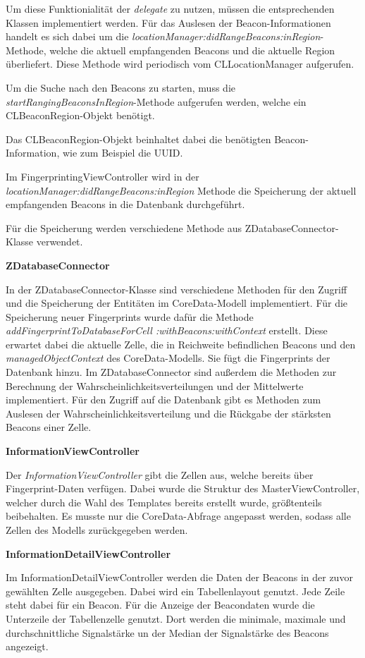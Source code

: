 Um diese Funktionialität der \emph{delegate} zu nutzen, müssen die entsprechenden Klassen implementiert werden. Für das Auslesen der Beacon-Informationen handelt es sich dabei um die \emph{locationManager:didRangeBeacons:inRegion}-Methode, welche die aktuell empfangenden Beacons und die aktuelle Region überliefert. Diese Methode wird periodisch vom CLLocationManager aufgerufen.

Um die Suche nach den Beacons zu starten, muss die \emph{startRangingBeaconsInRegion}-Methode aufgerufen werden, welche ein CLBeaconRegion-Objekt benötigt.

Das CLBeaconRegion-Objekt beinhaltet dabei die benötigten Beacon-Information, wie zum Beispiel die UUID.

Im FingerprintingViewController wird in der \emph{locationManager:didRangeBeacons:inRegion} Methode die Speicherung der aktuell empfangenden Beacons in die Datenbank durchgeführt.

Für die Speicherung werden verschiedene Methode aus ZDatabaseConnector-Klasse verwendet.

\textbf{ZDatabaseConnector}

In der ZDatabaseConnector-Klasse sind verschiedene Methoden für den Zugriff und die Speicherung der Entitäten im CoreData-Modell implementiert.
Für die Speicherung neuer Fingerprints wurde dafür die Methode \emph{addFingerprintToDatabaseForCell :withBeacons:withContext} erstellt. Diese erwartet dabei die aktuelle Zelle, die in Reichweite befindlichen Beacons und den \emph{managedObjectContext} des CoreData-Modells. Sie fügt die Fingerprints der Datenbank hinzu.
Im ZDatabaseConnector sind außerdem die Methoden zur Berechnung der Wahrscheinlichkeitsverteilungen und der Mittelwerte implementiert.
Für den Zugriff auf die Datenbank gibt es Methoden zum Auslesen der Wahrscheinlichkeitsverteilung und die Rückgabe der stärksten Beacons einer Zelle.

\textbf{InformationViewController}

Der \emph{InformationViewController} gibt die Zellen aus, welche bereits über Fingerprint-Daten verfügen. Dabei wurde die Struktur des MasterViewController, welcher durch die Wahl des Templates bereits erstellt wurde, größtenteils beibehalten. Es musste nur die CoreData-Abfrage angepasst werden, sodass alle Zellen des Modells zurückgegeben werden.


\textbf{InformationDetailViewController}

Im InformationDetailViewController werden die Daten der Beacons in der zuvor gewählten Zelle ausgegeben. Dabei wird ein Tabellenlayout genutzt. Jede Zeile steht dabei für ein Beacon. 
Für die Anzeige der Beacondaten wurde die Unterzeile der Tabellenzelle genutzt. Dort werden die minimale, maximale und durchschnittliche Signalstärke un der Median der Signalstärke des Beacons angezeigt.


